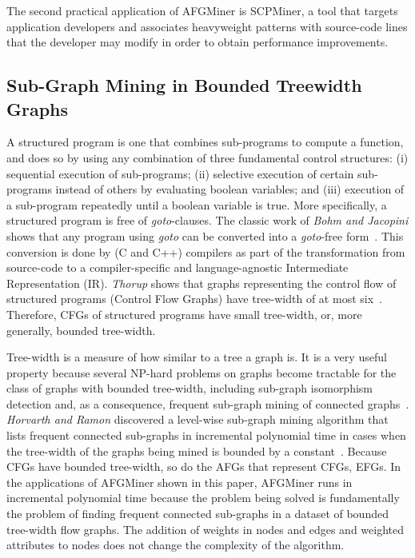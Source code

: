 The second practical application of AFGMiner is SCPMiner, a tool that targets application developers and associates heavyweight patterns with source-code lines that the developer may modify in order to obtain performance improvements.

\subsection{Sub-Graph Mining in Bounded Treewidth Graphs}

A structured program is one that combines sub-programs to compute a function, and does so by using any combination of three fundamental control structures: (i) sequential execution of sub-programs; (ii) selective execution of certain sub-programs instead of others by evaluating boolean variables; and (iii) execution of a sub-program repeatedly until a boolean variable is true. More specifically, a structured program is free of \emph{goto}-clauses. The classic work of \emph{Bohm and Jacopini} shows that any program using \emph{goto} can be converted into a \emph{goto}-free form~\cite{Bohm}. This conversion is done by (\eg C and C++) compilers as part of the transformation from source-code to a compiler-specific and language-agnostic Intermediate Representation (IR). \emph{Thorup} shows that graphs representing the control flow of structured programs (\ie Control Flow Graphs) have tree-width of at most six~\cite{Thorup}. Therefore, CFGs of structured programs have small tree-width, or, more generally, bounded tree-width. 

Tree-width is a measure of how similar to a tree a graph is. It is a very useful property because several NP-hard problems on graphs become tractable for the class of graphs with bounded tree-width, including sub-graph isomorphism detection and, as a consequence, frequent sub-graph mining of connected graphs~\cite{Horvath}. \emph{Horvarth and Ramon} discovered a level-wise sub-graph mining algorithm that lists frequent connected sub-graphs in incremental polynomial time in cases when the tree-width of the graphs being mined is bounded by a constant~\cite{Horvath}. Because CFGs have bounded tree-width, so do the AFGs that represent CFGs, \ie EFGs. In the applications of AFGMiner shown in this paper, AFGMiner runs in incremental polynomial time because the problem being solved is fundamentally the problem of finding frequent connected sub-graphs in a dataset of bounded tree-width flow graphs. The addition of weights in nodes and edges and weighted attributes to nodes does not change the complexity of the algorithm. 

